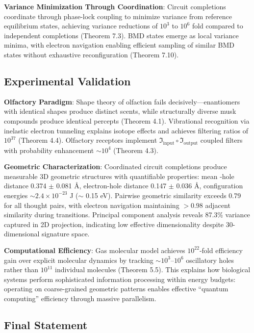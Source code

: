 \documentclass[11pt,a4paper]{article}
\begin{document}
\textbf{Variance Minimization Through Coordination}: Circuit completions coordinate through phase-lock coupling to minimize variance from reference equilibrium states, achieving variance reductions of $10^3$ to $10^6$ fold compared to independent completions (Theorem 7.3). BMD states emerge as local variance minima, with electron navigation enabling efficient sampling of similar BMD states without exhaustive reconfiguration (Theorem 7.10).

\subsection{Experimental Validation}

\textbf{Olfactory Paradigm}: Shape theory of olfaction fails decisively—enantiomers with identical shapes produce distinct scents, while structurally diverse musk compounds produce identical percepts (Theorem 4.1). Vibrational recognition via inelastic electron tunneling explains isotope effects and achieves filtering ratios of $10^{37}$ (Theorem 4.4). Olfactory receptors implement $\Im_{\text{input}} \circ \Im_{\text{output}}$ coupled filters with probability enhancement $\sim 10^4$ (Theorem 4.3).

\textbf{Geometric Characterization}: Coordinated circuit completions produce measurable 3D geometric structures with quantifiable properties: mean -hole distance 0.374 $\pm$ 0.081 Å, electron-hole distance 0.147 $\pm$ 0.036 Å, configuration energies $\sim 2.4 \times 10^{-23}$ J ($\sim$ 0.15 eV). Pairwise geometric similarity exceeds 0.79 for all thought pairs, with electron navigation maintaining $> 0.98$ adjacent similarity during transitions. Principal component analysis reveals 87.3\% variance captured in 2D projection, indicating low effective dimensionality despite 30-dimensional signature space.

\textbf{Computational Efficiency}: Gas molecular model achieves $10^{22}$-fold efficiency gain over explicit molecular dynamics by tracking $\sim 10^3$--$10^6$ oscillatory holes rather than $10^{11}$ individual molecules (Theorem 5.5). This explains how biological systems perform sophisticated information processing within energy budgets: operating on coarse-grained geometric patterns enables effective ``quantum computing'' efficiency through massive parallelism.


\subsection{Final Statement}
\end{document}
